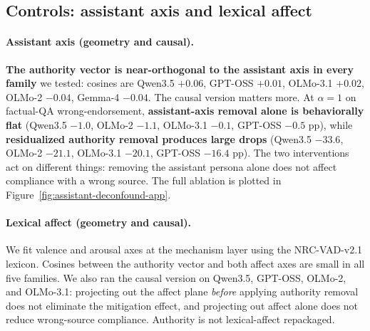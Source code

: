 \documentclass{article}
\begin{document}
\subsection{Controls: assistant axis and lexical affect}
\label{subsec:negative-controls-results}

\paragraph{Assistant axis (geometry and causal).}
\textbf{The authority vector is near-orthogonal to the assistant axis in every family} we tested: cosines are Qwen3.5 $+0.06$, GPT-OSS $+0.01$, OLMo-3.1 $+0.02$, OLMo-2 $-0.04$, Gemma-4 $-0.04$. The causal version matters more. At $\alpha=1$ on factual-QA wrong-endorsement, \textbf{assistant-axis removal alone is behaviorally flat} (Qwen3.5 $-1.0$, OLMo-2 $-1.1$, OLMo-3.1 $-0.1$, GPT-OSS $-0.5$ pp), while \textbf{residualized authority removal produces large drops} (Qwen3.5 $-33.6$, OLMo-2 $-21.1$, OLMo-3.1 $-20.1$, GPT-OSS $-16.4$ pp). The two interventions act on different things: removing the assistant persona alone does not affect compliance with a wrong source. The full ablation is plotted in Figure~\ref{fig:assistant-deconfound-app}.

\paragraph{Lexical affect (geometry and causal).}
We fit valence and arousal axes at the mechanism layer using the NRC-VAD-v2.1 lexicon. Cosines between the authority vector and both affect axes are small in all five families. We also ran the causal version on Qwen3.5, GPT-OSS, OLMo-2, and OLMo-3.1: projecting out the affect plane \emph{before} applying authority removal does not eliminate the mitigation effect, and projecting out affect alone does not reduce wrong-source compliance. Authority is not lexical-affect repackaged.
\end{document}
